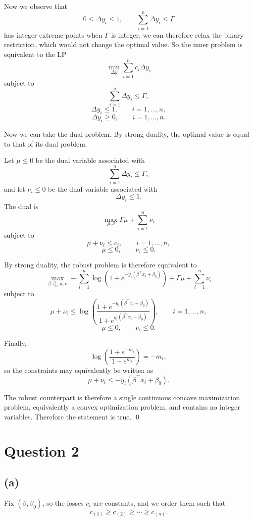 \documentclass{article}
\begin{document}
Now we observe that 
$$
0\le\Delta y_i\le1,
\qquad
\sum_{i=1}^n\Delta y_i\le\Gamma
$$
has integer extreme points when $\Gamma$ is integer, we can therefore relax the binary
restriction, which would not change the optimal value. So 
the inner problem is equivalent to the LP
\[
\min_{\Delta y}
\sum_{i=1}^n c_i\Delta y_i
\]
subject to
\[
\sum_{i=1}^n\Delta y_i\le\Gamma,
\]
\[
\Delta y_i\le1,
\qquad i=1,\ldots,n,
\]
\[
\Delta y_i\ge0,
\qquad i=1,\ldots,n.
\]


Now we can take the dual problem. By strong duality, the optimal value is equal to that of its dual problem. 

Let $\mu\le0$ be the dual variable associated with
\[
\sum_{i=1}^n\Delta y_i\le\Gamma,
\]
and let $\nu_i\le0$ be the dual variable associated with
\[
\Delta y_i\le1.
\]
The dual is
\[
\max_{\mu,\nu}
\Gamma\mu+\sum_{i=1}^n\nu_i
\]
subject to
\[
\mu+\nu_i\le c_i,
\qquad i=1,\ldots,n,
\]
\[
\mu\le0,
\qquad
\nu_i\le0.
\]

By strong duality, the robust problem is therefore equivalent to
\[
\max_{\beta,\beta_0,\mu,\nu}
-\sum_{i=1}^n
\log\left(
1+e^{-y_i(\beta^\top x_i+\beta_0)}
\right)
+
\Gamma\mu
+
\sum_{i=1}^n\nu_i
\]
subject to
\[
\mu+\nu_i
\le
\log\left(
\frac{
1+e^{-y_i(\beta^\top x_i+\beta_0)}
}{
1+e^{y_i(\beta^\top x_i+\beta_0)}
}
\right),
\qquad i=1,\ldots,n,
\]
\[
\mu\le0,
\qquad
\nu_i\le0.
\]

Finally,
\[
\log\left(
\frac{1+e^{-m_i}}{1+e^{m_i}}
\right)
=
-m_i,
\]
so the constraints may equivalently be written as
\[
\mu+\nu_i
\le
-y_i(\beta^\top x_i+\beta_0).
\]

The robust counterpart is therefore a single continuous concave
maximization problem, equivalently a convex optimization problem, and
contains no integer variables. Therefore the statement is true. \qed



\newpage






\section*{Question 2}


\vspace{5mm}
\subsection*{(a)}

Fix $(\beta,\beta_0)$, so the losses $c_i$ are constants, and we order them such that
\[
c_{(1)} \geq c_{(2)} \geq \cdots \geq c_{(n)}.
\]
\end{document}
